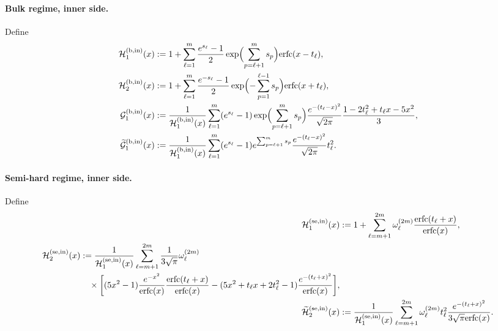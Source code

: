 \documentclass[a4paper]{article}
\newcommand{\erfc}{{\rm erfc}}
\numberwithin{equation}{section}
\begin{document}
\paragraph{Bulk regime, inner side.}
Define
\begin{align}
\mathcal{H}_1^{(\mathrm{b,in})}(x)
&:=
1+\sum_{\ell=1}^{m}\frac{e^{s_{\ell}}-1}{2}
\exp\Bigl( 
\sum_{p=\ell+1}^{m}s_{p}
\Bigr)
\erfc(x-t_{\ell}),
\\
\mathcal{H}_2^{(\mathrm{b,in})}(x)
&:=
1+\sum_{\ell=1}^{m}\frac{e^{-s_{\ell}}-1}{2}
\exp\Bigl( 
-\sum_{p=1}^{\ell-1}s_{p}
\Bigr)
\erfc(x+t_{\ell}), 
\\
\mathcal{G}_1^{(\mathrm{b,in})}(x)
&:=\frac{1}{\mathcal{H}_1^{(\mathrm{b,in})}(x)}
\sum_{\ell=1}^{m}
(e^{s_{\ell}}-1)
\exp\Bigl(\sum_{p=\ell+1}^{m}s_{p}\Bigr)
\frac{e^{-(t_{\ell}-x)^2}}{\sqrt{2\pi}}
\frac{1-2t_{\ell}^2+t_{\ell}x-5x^2}{3}, 
\\
\widetilde{\mathcal{G}}_1^{(\mathrm{b,in})}(x)
&:=
\frac{1}{\mathcal{H}_1^{(\mathrm{b,in})}(x)}
\sum_{\ell=1}^{m}
(e^{s_{\ell}}-1)
e^{\sum_{p=\ell+1}^{m}s_{p}}
\frac{e^{-(t_{\ell}-x)^2}}{\sqrt{2\pi}}
t_{\ell}^2. 
\end{align}
\paragraph{Semi-hard regime, inner side.}
Define
\begin{align}
\mathcal{H}_1^{(\mathrm{se,in})}(x)
&:=
1+\sum_{\ell=m+1}^{2m}\omega_{\ell}^{(2m)}\frac{\erfc(t_{\ell}+x)}{\erfc(x)}, 
\\
\begin{split}
\mathcal{H}_2^{(\mathrm{se,in})}(x)
&:=
\frac{1}{\mathcal{H}_1^{(\mathrm{se,in})}(x)}
\sum_{\ell=m+1}^{2m} \frac{1}{3\sqrt{\pi}}\omega_{\ell}^{(2m)}
\\
&\quad
\times
\bigg[
(5x^2-1)
\frac{e^{-x^2}}{\erfc(x)}
\frac{\erfc(t_{\ell}+x)}{\erfc(x)}
-
(5x^2+t_{\ell}x+2t_{\ell}^2-1)\frac{e^{-(t_{\ell}+x)^2}}{\erfc(x)}
\bigg], 
\end{split}
\\
\widetilde{\mathcal{H}}_2^{(\mathrm{se,in})}(x)
&:=
\frac{1}{\mathcal{H}_1^{(\mathrm{se,in})}(x)}
\sum_{\ell=m+1}^{2m}\omega_{\ell}^{(2m)}t_{\ell}^2\frac{e^{-(t_{\ell}+x)^2}}{3\sqrt{\pi}\erfc(x)}.
\end{align}
\end{document}
